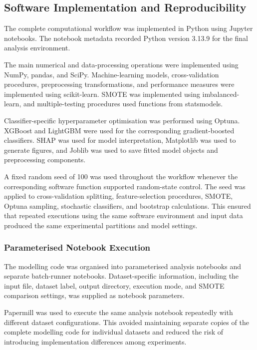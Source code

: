 \documentclass[12pt,twocolumn]{article}
\begin{document}
\subsection{Software Implementation and Reproducibility}
\label{subsec:software_reproducibility}

The complete computational workflow was implemented in Python using
Jupyter notebooks. The notebook metadata recorded Python version
3.13.9 for the final analysis environment.

The main numerical and data-processing operations were implemented
using NumPy, pandas, and SciPy. Machine-learning models,
cross-validation procedures, preprocessing transformations, and
performance measures were implemented using scikit-learn. SMOTE was
implemented using imbalanced-learn, and multiple-testing procedures
used functions from statsmodels.

Classifier-specific hyperparameter optimisation was performed using
Optuna. XGBoost and LightGBM were used for the corresponding
gradient-boosted classifiers. SHAP was used for model interpretation,
Matplotlib was used to generate figures, and Joblib was used to save
fitted model objects and preprocessing components.

A fixed random seed of 100 was used throughout the workflow whenever
the corresponding software function supported random-state control.
The seed was applied to cross-validation splitting, feature-selection
procedures, SMOTE, Optuna sampling, stochastic classifiers, and
bootstrap calculations. This ensured that repeated executions using
the same software environment and input data produced the same
experimental partitions and model settings.



\subsubsection{Parameterised Notebook Execution}
\label{subsubsec:parameterised_execution}

The modelling code was organised into parameterised analysis notebooks
and separate batch-runner notebooks. Dataset-specific information,
including the input file, dataset label, output directory, execution
mode, and SMOTE comparison settings, was supplied as notebook
parameters.

Papermill was used to execute the same analysis notebook repeatedly
with different dataset configurations. This avoided maintaining
separate copies of the complete modelling code for individual
datasets and reduced the risk of introducing implementation
differences among experiments.
\end{document}
